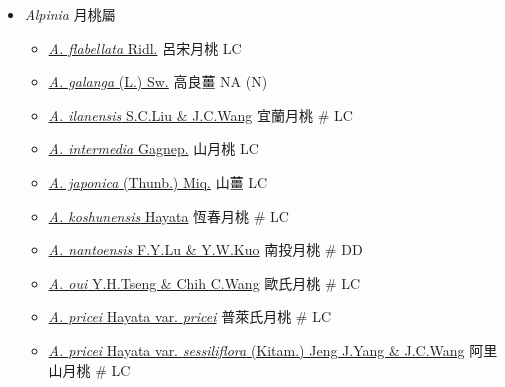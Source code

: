 
  \begin{itemize}
 \item[] \textit{Alpinia} 月桃屬
                                
  \begin{itemize}
        \item[] \href{http://www.theplantlist.org/tpl1.1/search?q=Alpinia+flabellata}{\textit{A. flabellata} Ridl.}   呂宋月桃   LC
        \item[] \href{http://www.theplantlist.org/tpl1.1/search?q=Alpinia+galanga}{\textit{A. galanga} (L.) Sw.}   高良薑   NA (N)
        \item[] \href{http://www.theplantlist.org/tpl1.1/search?q=Alpinia+ilanensis}{\textit{A. ilanensis} S.C.Liu \& J.C.Wang}   宜蘭月桃  \# LC
        \item[] \href{http://www.theplantlist.org/tpl1.1/search?q=Alpinia+intermedia}{\textit{A. intermedia} Gagnep.}   山月桃   LC
        \item[] \href{http://www.theplantlist.org/tpl1.1/search?q=Alpinia+japonica}{\textit{A. japonica} (Thunb.) Miq.}   山薑   LC
        \item[] \href{http://www.theplantlist.org/tpl1.1/search?q=Alpinia+koshunensis}{\textit{A. koshunensis} Hayata}   恆春月桃  \# LC
        \item[] \href{http://www.theplantlist.org/tpl1.1/search?q=Alpinia+nantoensis}{\textit{A. nantoensis} F.Y.Lu \& Y.W.Kuo}   南投月桃  \# DD
        \item[] \href{http://www.theplantlist.org/tpl1.1/search?q=Alpinia+oui}{\textit{A. oui} Y.H.Tseng \& Chih C.Wang}   歐氏月桃  \# LC
        \item[] \href{http://www.theplantlist.org/tpl1.1/search?q=Alpinia+pricei+var.+pricei}{\textit{A. pricei} Hayata var. \textit{pricei}}   普萊氏月桃  \# LC
        \item[] \href{http://www.theplantlist.org/tpl1.1/search?q=Alpinia+pricei+var.+sessiliflora}{\textit{A. pricei} Hayata var. \textit{sessiliflora} (Kitam.) Jeng J.Yang \& J.C.Wang}   阿里山月桃  \# LC

\end{itemize}
\end{itemize}
